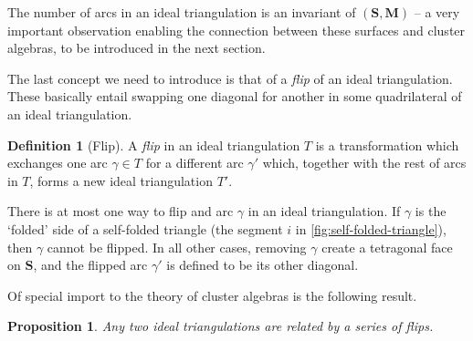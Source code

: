 \documentclass[a4paper,oneside,svgnames,draft]{amsart}
\theoremstyle{plain}
\newtheorem{proposition}[theorem]{Proposition}
\theoremstyle{definition}
\newtheorem{definition}[theorem]{Definition}
\begin{document}
 The number of arcs in an ideal triangulation is an invariant of
 $(\mathbf{S},\mathbf{M})$ -- a very important observation enabling the
 connection between these surfaces and cluster algebras, to be introduced in the
 next section.

 The last concept we need to introduce is that of a \emph{flip} of an ideal
 triangulation. These basically entail swapping one diagonal for another in some
 quadrilateral of an ideal triangulation.

 \begin{definition}[Flip]
  \label{def:flip}
  A \emph{flip} in an ideal triangulation $T$ is a transformation which
  exchanges one arc $\gamma \in T$ for a different arc $\gamma'$ which, together
  with the rest of arcs in $T$, forms a new ideal triangulation $T'$.
 \end{definition}

 There is at most one way to flip and arc $\gamma$ in an ideal triangulation. If
 $\gamma$ is the `folded' side of a self-folded triangle (the segment $i$ in
 \cref{fig:self-folded-triangle}), then $\gamma$ cannot be flipped. In all other
 cases, removing $\gamma$ create a tetragonal face on $\mathbf{S}$, and the
 flipped arc $\gamma'$ is defined to be its other diagonal.

 Of special import to the theory of cluster algebras is the following result.

 \begin{proposition}
  Any two ideal triangulations are related by a series of flips.
 \end{proposition}
\end{document}
